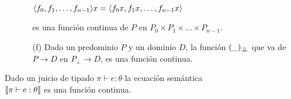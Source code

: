 \begin{proposition}
\begin{enumerate}
\begin{enumerate}
\begin{center}
$\langle f_0,f_1,\ldots,f_{n-1} \rangle x = \langle f_0 x,f_1 x,\ldots,f_{n-1} x \rangle$
\end{center}

es una funci\'on continua de $P$ en $P_0 \times P_1 \times \ldots \times P_{n-1}$.

\item[(f)] Dado un predominio $P$ y un dominio $D$, la funci\'on $(\_)_{\bot \!\!\! \bot}$ que va
de $P \rightarrow D$ en $P_{\bot} \rightarrow D$, es una funci\'on continua.

\end{enumerate}

\end{enumerate}

\end{proposition}

\begin{proposition}

Dado un juicio de tipado $\pi \vdash e : \theta$ la ecuaci\'on sem\'antica
\\ 
$\llbracket \pi \vdash e : \theta \rrbracket$ es una funci\'on continua.

\end{proposition}

